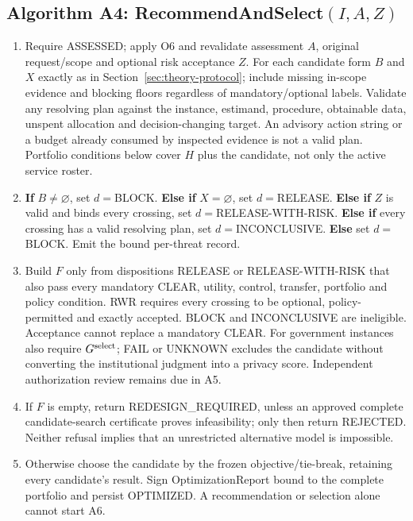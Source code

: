 \subsection{Algorithm A4: RecommendAndSelect$(I,A,Z)$}
\begin{enumerate}
\item Require ASSESSED; apply O6 and revalidate assessment $A$, original request/scope and
optional risk acceptance $Z$. For each candidate form $B$ and $X$ exactly as
in Section~\ref{sec:theory-protocol}; include missing in-scope evidence and
blocking floors regardless of mandatory/optional labels.
Validate any resolving plan against the instance, estimand, procedure,
obtainable data, unspent allocation and decision-changing target. An advisory
action string or a budget already consumed by inspected evidence is not a
valid plan. Portfolio conditions below cover $H$ plus the candidate, not only
the active service roster.
\item \textbf{If} $B\ne\varnothing$, set $d=$BLOCK.
\textbf{Else if} $X=\varnothing$, set $d=$RELEASE.
\textbf{Else if} $Z$ is valid and binds every crossing, set $d=$RELEASE-WITH-RISK.
\textbf{Else if} every crossing has a valid resolving plan, set $d=$INCONCLUSIVE.
\textbf{Else} set $d=$BLOCK. Emit the bound per-threat record.
\item Build $F$ only from dispositions RELEASE or RELEASE-WITH-RISK that also
pass every mandatory CLEAR, utility, control, transfer, portfolio and policy
condition. RWR requires every crossing to be optional, policy-permitted and
exactly accepted. BLOCK and INCONCLUSIVE are ineligible. Acceptance cannot
replace a mandatory CLEAR.
For government instances also require $G^{\rm select}$; FAIL or UNKNOWN
excludes the candidate without converting the institutional judgment into
a privacy score. Independent authorization review remains due in A5.
\item If $F$ is empty, return REDESIGN\_REQUIRED, unless an approved complete
candidate-search certificate proves infeasibility; only then return REJECTED.
Neither refusal implies that an unrestricted alternative model is impossible.
\item Otherwise choose the candidate by the frozen objective/tie-break,
retaining every candidate's result. Sign OptimizationReport bound to
the complete portfolio and persist OPTIMIZED. A recommendation or selection
alone cannot start A6.
\end{enumerate}

